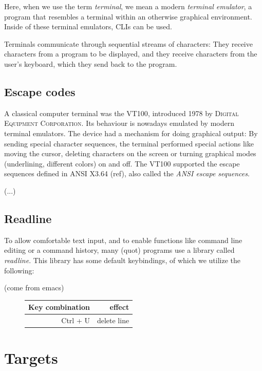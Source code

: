 \documentclass[paper=a4,abstract=on,cleardoublepage=empty,numbers=noenddot,toc=bib]{scrreprt}
\begin{document}
Here, when we use the term \emph{terminal}, we mean a modern \emph{terminal emulator}, a program that resembles a terminal within an otherwise graphical environment. Inside of these terminal emulators, \textsc{CLI}s can be used.

Terminals communicate through sequential streams of characters: They receive characters from a program to be displayed, and they receive characters from the user's keyboard, which they send back to the program.

\subsection{Escape codes}

A classical computer terminal was the \textsc{VT100}, introduced 1978 by \textsc{Digital Equipment Corporation}. Its behaviour is nowadays emulated by modern terminal emulators. The device had a mechanism for doing graphical output: By sending special character sequences, the terminal performed special actions like moving the cursor, deleting characters on the screen or turning graphical modes (underlining, different colors) on and off. The \textsc{VT100} supported the escape sequences defined in ANSI X3.64 (ref), also called the \emph{ANSI escape sequences}.

(...)

\subsection{Readline}

To allow comfortable text input, and to enable functions like command line editing or a command history, many (quot) programs use a library called \emph{readline}. This library has some default keybindings, of which we utilize the following:

(come from emacs)

\begin{figure}
    \begin{tabular}{r|r}
        Key combination & effect \\
        \hline
        Ctrl + U & delete line \\
    \end{tabular}
\end{figure}

\section{Targets}
\end{document}
